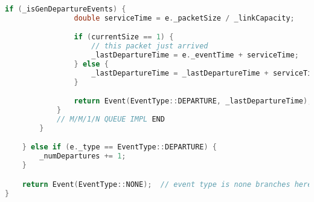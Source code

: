 \documentclass{article}
\begin{document}
\begin{lstlisting}[language=C++,
                   directivestyle={\color{black}}
                   emph={int,char,double,float,unsigned},
                   emphstyle={\color{blue}}
                  ]
            if (_isGenDepartureEvents) {
                double serviceTime = e._packetSize / _linkCapacity;

                if (currentSize == 1) {
                    // this packet just arrived
                    _lastDepartureTime = e._eventTime + serviceTime;
                } else {
                    _lastDepartureTime = _lastDepartureTime + serviceTime;
                }

                return Event(EventType::DEPARTURE, _lastDepartureTime);
            }
            // M/M/1/N QUEUE IMPL END
        }

    } else if (e._type == EventType::DEPARTURE) {
        _numDepartures += 1;
    }

    return Event(EventType::NONE);  // event type is none branches here
}
\end{lstlisting}
\end{document}
